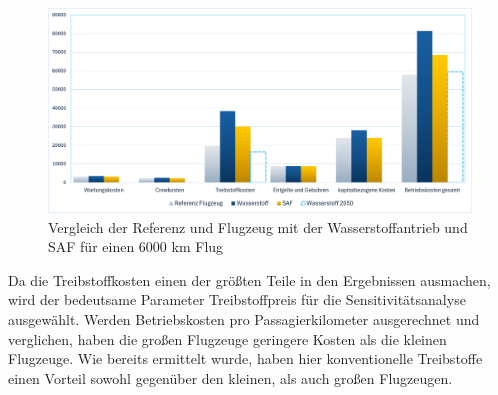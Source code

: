\begin{figure}[h]
	\centering
	\includegraphics[width=0.9\linewidth]{Bilder/VergleichWA_SAF.png}
	\caption[Betriebskosten]{Vergleich der Referenz und Flugzeug mit der Wasserstoffantrieb und SAF für einen 6000 km Flug}
	\label{vergleichWA_Ref}
\end{figure}

Da die Treibstoffkosten einen der größten Teile in den Ergebnissen ausmachen, 
wird der bedeutsame Parameter Treibstoffpreis für die Sensitivitätsanalyse ausgewählt.
%
Werden Betriebskosten pro Passagierkilometer ausgerechnet und verglichen, 
haben die großen Flugzeuge geringere Kosten als die kleinen Flugzeuge.
Wie bereits ermittelt wurde, haben hier konventionelle Treibstoffe %
einen Vorteil sowohl gegenüber den kleinen, als auch großen Flugzeugen.
